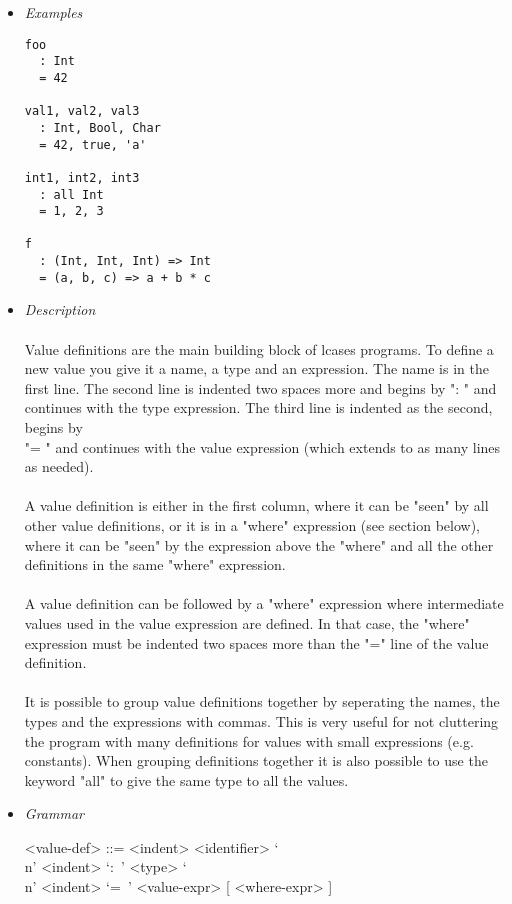 \documentclass{article}
\begin{document}
\begin{itemize}

\item \textit{Examples}

\begin{verbatim}
foo
  : Int
  = 42

val1, val2, val3
  : Int, Bool, Char
  = 42, true, 'a'

int1, int2, int3
  : all Int
  = 1, 2, 3

f
  : (Int, Int, Int) => Int
  = (a, b, c) => a + b * c
\end{verbatim}

\item \textit{Description}\\\\
Value definitions are the main building block of lcases programs. To define a
new value you give it a name, a type and an expression. The name is in the
first line. The second line is indented two spaces more and begins by ": " and
continues with the type expression. The third line is indented as the second,
begins by \\ "= " and continues with the value expression (which extends to as
many lines as needed).
\\\\
A value definition is either in the first column, where it can be "seen" by all
other value definitions, or it is in a "where" expression (see section below),
where it can be "seen" by the expression above the "where" and all the other
definitions in the same "where" expression.
\\\\
A value definition can be followed by a "where" expression where intermediate
values used in the value expression are defined. In that case, the "where"
expression must be indented two spaces more than the "=" line of the value
definition.
\\\\
It is possible to group value definitions together by seperating the names, the
types and the expressions with commas. This is very useful for not cluttering
the program with many definitions for values with small expressions (e.g.
constants).  When grouping definitions together it is also possible to use the
keyword "all" to give the same type to all the values.

\item \textit{Grammar}
\begin{grammar}
<value-def> ::= 
<indent> <identifier> 
`\\n' <indent> `:\ ' <type> 
`\\n' <indent> `=\ ' <value-expr> [ <where-expr> ]


\end{grammar}
\end{itemize}
\end{document}
